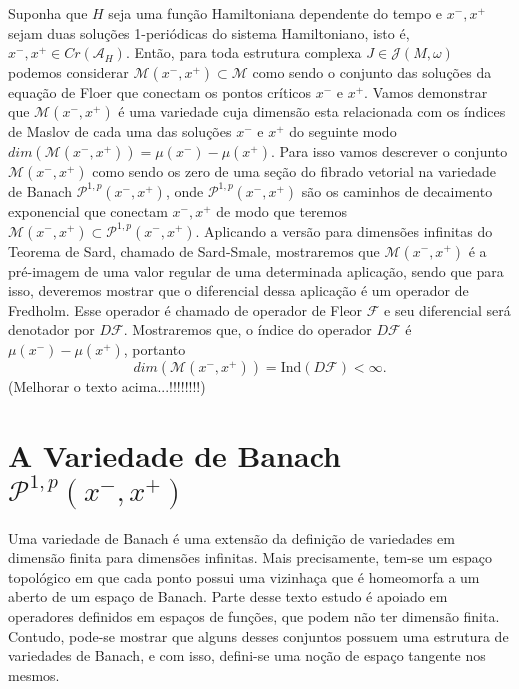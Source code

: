 \documentclass[12pt]{book}
\newcommand{\caminhosexponenciaisconectantes}[2]{\mathcal{P}^{1,p}(#1, #2)}
\newcommand{\caminhosexponenciaisconectantespadrao}{\caminhosexponenciaisconectantes{x^{-}}{x^{+}}}
\newcommand{\diferencialfloer}{D\operadorFloer}
\newcommand{\energiafinitaM}{\mathcal{M}}
\newcommand{\energiafinitaMconectante}{\energiafinitaM(x^{-}, x^{+})}
\newcommand{\estruturascomplexas}[2]{\mathcal{J}(#1, #2)}
\newcommand{\funcionalH}{\mathcal{A}_{H}}
\newcommand{\ind}{\text{Ind}}
\newcommand{\operadorFloer}{\mathcal{F}}
\newcommand{\pontoscriticos}[1]{\textit{Cr}(#1)}
\newcommand{\alerta}[1]{{\color{red}#1}}
\begin{document}
	Suponha que $H$ seja uma função Hamiltoniana dependente do tempo e $x^{-}, x^{+}$ sejam duas soluções 1-periódicas do sistema Hamiltoniano, isto é, $x^{-}, x^{+} \in \pontoscriticos{\funcionalH}$. Então, para toda estrutura complexa $J \in \estruturascomplexas{M}{\omega}$ podemos considerar $\energiafinitaMconectante \subset \energiafinitaM$ como sendo o conjunto das soluções da equação de Floer que conectam os pontos críticos $x^{-}$ e $x^{+}$. Vamos demonstrar que $\energiafinitaMconectante$ é uma variedade cuja dimensão esta relacionada com os índices de Maslov de cada uma das soluções $x^{-}$ e $x^{+}$ do seguinte modo $dim(\energiafinitaMconectante) = \mu(x^{-})-\mu(x^{+})$. Para isso vamos descrever o conjunto $\energiafinitaMconectante$ como sendo os zero de uma seção do fibrado vetorial na variedade de Banach $\caminhosexponenciaisconectantespadrao$, onde $\caminhosexponenciaisconectantespadrao$ são os caminhos de decaimento exponencial que conectam $x^{-}, x^{+}$ de modo que teremos $\energiafinitaMconectante \subset \caminhosexponenciaisconectantespadrao$. Aplicando a versão para dimensões infinitas do Teorema de Sard, chamado de Sard-Smale, mostraremos que $\energiafinitaMconectante$ é a pré-imagem de uma valor regular de uma determinada aplicação, sendo que para isso, deveremos mostrar que o diferencial dessa aplicação é um operador de Fredholm. Esse operador é chamado de operador de Fleor $\operadorFloer$ e seu diferencial será denotador por $\diferencialfloer$. Mostraremos que, o índice do operador $\diferencialfloer$ é $\mu(x^{-}) - \mu(x^{+})$, portanto 
	$$
	dim(\energiafinitaMconectante)=\ind(\diferencialfloer) <\infty.
	$$
	\alerta{(Melhorar o texto acima...!!!!!!!!)}
	
	\section{A Variedade de Banach $\caminhosexponenciaisconectantespadrao$}\label{secao_variedade_banach_P}
	
	Uma variedade de Banach é uma extensão da definição de variedades em dimensão finita para dimensões infinitas. Mais precisamente, tem-se um espaço topológico em que cada ponto possui uma vizinhaça que é homeomorfa a um aberto de um espaço de Banach. Parte desse texto estudo é apoiado em operadores definidos em espaços de funções, que podem não ter dimensão finita. Contudo, pode-se mostrar que alguns desses conjuntos possuem uma estrutura de variedades de Banach, e com isso, defini-se uma noção de espaço tangente nos mesmos. 
	
\end{document}
